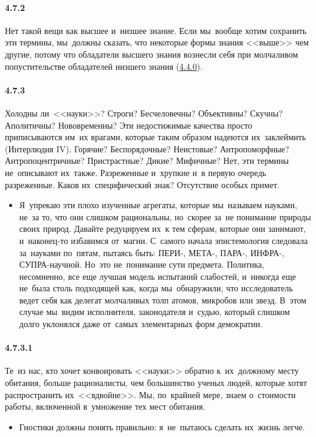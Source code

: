 \paragraph{4.7.2}\hypertarget{par:4.7.2}{} Нет такой вещи как высшее и~низшее знание. Если мы~вообще хотим сохранить эти термины, мы~должны сказать, что некоторые формы знания <<выше>> чем другие, потому что обладатели высшего знания вознесли себя при молчаливом попустительстве обладателей низшего знания (\hyperlink{par:4.4.0}{4.4.0}).


\paragraph{4.7.3}\hypertarget{par:4.7.3}{} Холодны ли~<<науки>>? Строги? Бесчеловечны? Объективны? Скучны? Аполитичны? Нововременны? Эти недостижимые качества просто приписываются им~их врагами, которые таким образом надеются их~заклеймить (Интерлюдия IV). Горячие? Беспорядочные? Неистовые? Антропоморфные? Антропоцентричные? Пристрастные? Дикие? Мифичные? Нет, эти термины не~описывают их~также. Разреженные и~хрупкие и~в первую очередь разреженные. Каков их~специфический знак? Отсутствие особых примет.
	\begin{itemize}
	\item 
 Я~упрекаю эти плохо изученные агрегаты, которые мы~называем науками, не~за то, что они слишком рациональны, но~скорее за~не понимание природы своих природ. Давайте редуцируем их~к тем сферам, которые они занимают, и~наконец-то избавимся от~магии. С~самого начала эпистемология следовала за~науками по~пятам, пытаясь быть: ПЕРИ-, МЕТА-, ПАРА-, ИНФРА-, СУПРА-научной. Но~это не~понимание сути предмета. Политика, несомненно, все еще лучшая модель испытаний слабостей, и~никогда еще не~была столь подходящей как, когда мы~обнаружили, что исследователь ведет себя как делегат молчаливых толп атомов, микробов или звезд. В~этом случае мы~видим исполнителя, законодателя и~судью, который слишком долго уклонялся даже от~самых элементарных форм демократии.
	\end{itemize}	

\paragraph{4.7.3.1}\hypertarget{par:4.7.3.1}{} Те~из нас, кто хочет конвоировать <<науки>> обратно к~их~должному месту обитания, больше рационалисты, чем большинство ученых людей, которые хотят распространить их~<<вдвойне>>. Мы, по~крайней мере, знаем о~стоимости работы, включенной в~умножение тех мест обитания.
	\begin{itemize}
	\item 
	Гностики должны понять правильно: я~не~пытаюсь сделать их~жизнь легче.
	\end{itemize}	

